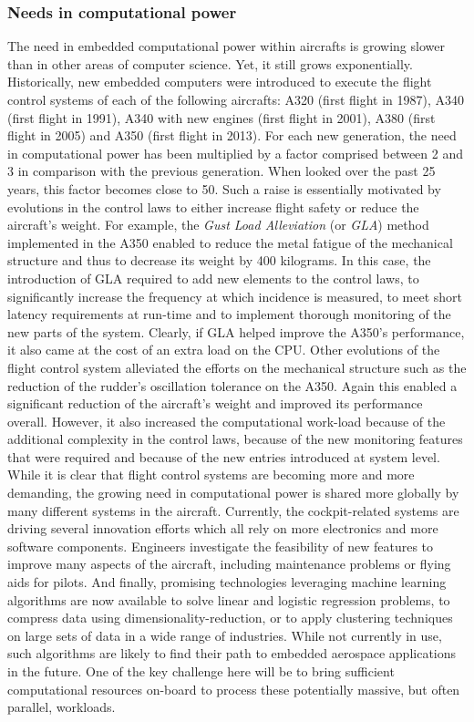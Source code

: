 \documentclass[main.tex]{subfiles}
\begin{document}
\subsubsection{Needs in computational power} The need in embedded computational
power within aircrafts is growing slower than in other areas of computer
science. Yet, it still grows exponentially. Historically, new embedded
computers were introduced to execute the flight control systems of each of the
following aircrafts: A320 (first flight in 1987), A340 (first flight in 1991),
A340 with new engines (first flight in 2001), A380 (first flight in 2005) and
A350 (first flight in 2013). For each new generation, the need in computational
power has been multiplied by a factor comprised between 2 and 3 in comparison
with the previous generation. When looked over the past 25 years, this factor
becomes close to 50. Such a raise is essentially motivated by evolutions in the
control laws to either increase flight safety or reduce the aircraft's weight.
For example, the \emph{Gust Load Alleviation} (or \emph{GLA}) method
implemented in the A350 enabled to reduce the metal fatigue of the mechanical
structure and thus to decrease its weight by 400 kilograms. In this case, the
introduction of GLA required to add new elements to the control laws, to
significantly increase the frequency at which incidence is measured, to meet
short latency requirements at run-time and to implement thorough monitoring of
the new parts of the system. Clearly, if GLA helped improve the A350's
performance, it also came at the cost of an extra load on the CPU. Other
evolutions of the flight control system alleviated the efforts on the
mechanical structure such as the reduction of the rudder's oscillation
tolerance on the A350. Again this enabled a significant reduction of the
aircraft's weight and improved its performance overall. However, it also
increased the computational work-load because of the additional complexity in
the control laws, because of the new monitoring features that were required and
because of the new entries introduced at system level.  While it is clear that
flight control systems are becoming more and more demanding, the growing need
in computational power is shared more globally by many different systems in the
aircraft. Currently, the cockpit-related systems are driving several innovation
efforts which all rely on more electronics and more software components.
Engineers investigate the feasibility of new features to improve many aspects
of the aircraft, including maintenance problems or flying aids for pilots.  And
finally, promising technologies leveraging machine learning algorithms are now
available to solve linear and logistic regression problems, to compress data
using dimensionality-reduction, or to apply clustering techniques on large sets
of data in a wide range of industries. While not currently in use, such
algorithms are likely to find their path to embedded aerospace applications in
the future. One of the key challenge here will be to bring sufficient
computational resources on-board to process these potentially massive, but
often parallel, workloads.
\end{document}
